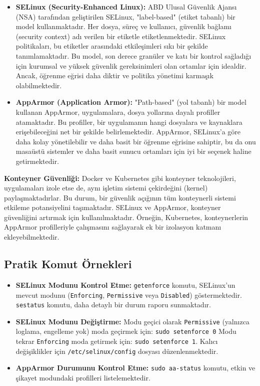 \begin{itemize}
    \item \textbf{SELinux (Security-Enhanced Linux):} ABD Ulusal Güvenlik Ajansı (NSA) tarafından geliştirilen SELinux, "label-based" (etiket tabanlı) bir model kullanmaktadır. Her dosya, süreç ve kullanıcı, güvenlik bağlamı (security context) adı verilen bir etiketle etiketlenmektedir. SELinux politikaları, bu etiketler arasındaki etkileşimleri sıkı bir şekilde tanımlamaktadır. Bu model, son derece granüler ve katı bir kontrol sağladığı için kurumsal ve yüksek güvenlik gereksinimleri olan ortamlar için idealdir. Ancak, öğrenme eğrisi daha diktir ve politika yönetimi karmaşık olabilmektedir.
    \item \textbf{AppArmor (Application Armor):} "Path-based" (yol tabanlı) bir model kullanan AppArmor, uygulamalara, dosya yollarına dayalı profiller atamaktadır. Bu profiller, bir uygulamanın hangi dosyalara ve kaynaklara erişebileceğini net bir şekilde belirlemektedir. AppArmor, SELinux'a göre daha kolay yönetilebilir ve daha basit bir öğrenme eğrisine sahiptir, bu da onu masaüstü sistemler ve daha basit sunucu ortamları için iyi bir seçenek haline getirmektedir.
\end{itemize}

\textbf{Konteyner Güvenliği:} Docker ve Kubernetes gibi konteyner teknolojileri, uygulamaları izole etse de, aynı işletim sistemi çekirdeğini (kernel) paylaşmaktadırlar. Bu durum, bir güvenlik açığının tüm konteynerli sistemi etkileme potansiyelini taşımaktadır. SELinux ve AppArmor, konteyner güvenliğini artırmak için kullanılmaktadır. Örneğin, Kubernetes, konteynerlerin AppArmor profilleriyle çalışmasını sağlayarak ek bir izolasyon katmanı ekleyebilmektedir.

\subsection{Pratik Komut Örnekleri}

\begin{itemize}
    \item \textbf{SELinux Modunu Kontrol Etme:} \texttt{getenforce} komutu, SELinux'un mevcut modunu (\texttt{Enforcing}, \texttt{Permissive} veya \texttt{Disabled}) göstermektedir. \texttt{sestatus} komutu, daha detaylı bir durum raporu sunmaktadır.
    \item \textbf{SELinux Modunu Değiştirme:} Modu geçici olarak \texttt{Permissive} (yalnızca loglama, engelleme yok) moda geçirmek için: \texttt{sudo setenforce 0} Modu tekrar \texttt{Enforcing} moda getirmek için: \texttt{sudo setenforce 1}. Kalıcı değişiklikler için \texttt{/etc/selinux/config} dosyası düzenlenmektedir.
    \item \textbf{AppArmor Durumunu Kontrol Etme:} \texttt{sudo aa-status} komutu, etkin ve şikayet modundaki profilleri listelemektedir.
\end{itemize}

